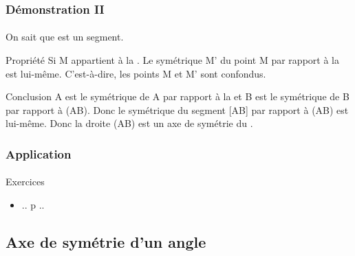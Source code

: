 \documentclass{beamer}
\begin{document}
\begin{frame}
	\frametitle{Démonstration II}  
	\framesubtitle{}
	
	\begin{block}{On sait que}
		 est un segment.\pause
	\end{block}
	
	\begin{block}{Propriété}
		Si M appartient à la .
		Le symétrique M' du point M par rapport à la  est lui-même.
		C'est-à-dire, les points M et M' sont confondus.\pause
	\end{block}
	
	\begin{block}{Conclusion}
		A est le symétrique de A par rapport à la  et B est le symétrique de B par rapport à (AB).
		Donc le symétrique du segment [AB] par rapport à (AB) est lui-même.
		Donc la droite (AB) est un axe de symétrie du \seg[AB].
	\end{block}
\end{frame}

\begin{frame}
	\frametitle{Application}  
	\framesubtitle{}
	
	\begin{block}{Exercices}
		\begin{itemize}
			\item .. p ..
		\end{itemize}
	\end{block}
\end{frame}

\subsection{Axe de symétrie d'un angle}
\end{document}
